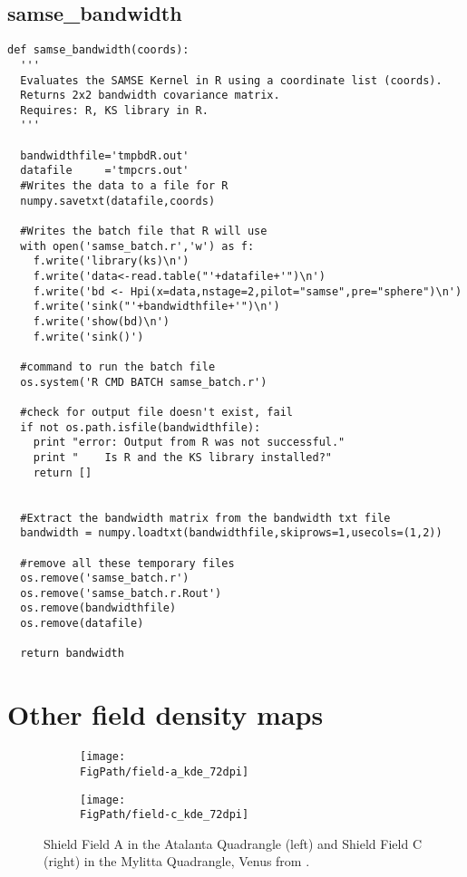 \subsection{samse\_bandwidth}
\begin{verbatim}
def samse_bandwidth(coords):
  '''
  Evaluates the SAMSE Kernel in R using a coordinate list (coords).
  Returns 2x2 bandwidth covariance matrix.
  Requires: R, KS library in R.
  '''
  
  bandwidthfile='tmpbdR.out'
  datafile     ='tmpcrs.out'
  #Writes the data to a file for R
  numpy.savetxt(datafile,coords)
  
  #Writes the batch file that R will use
  with open('samse_batch.r','w') as f:
    f.write('library(ks)\n')
    f.write('data<-read.table("'+datafile+'")\n')
    f.write('bd <- Hpi(x=data,nstage=2,pilot="samse",pre="sphere")\n')
    f.write('sink("'+bandwidthfile+'")\n')
    f.write('show(bd)\n')
    f.write('sink()')
  
  #command to run the batch file
  os.system('R CMD BATCH samse_batch.r')
  
  #check for output file doesn't exist, fail
  if not os.path.isfile(bandwidthfile):
    print "error: Output from R was not successful."
    print "    Is R and the KS library installed?"
    return []
  
  
  #Extract the bandwidth matrix from the bandwidth txt file
  bandwidth = numpy.loadtxt(bandwidthfile,skiprows=1,usecols=(1,2))
  
  #remove all these temporary files
  os.remove('samse_batch.r')
  os.remove('samse_batch.r.Rout')
  os.remove(bandwidthfile)
  os.remove(datafile)
  
  return bandwidth
\end{verbatim}


\newpage
\section{Other field density maps}

\begin{figure}[h!]
\centering
\begin{subfigure}{0.49\textwidth}
\centering
\texttt{[image: \\FigPath/field-a\_kde\_72dpi]}
\end{subfigure}
\begin{subfigure}{0.49\textwidth}
\centering
\texttt{[image: \\FigPath/field-c\_kde\_72dpi]}
\end{subfigure}
\caption[Shield Field A in the Atalanta Quadrangle and Shield Field C in the Mylitta Quadrangle, Venus from \citet{miller2012shield}]{Shield Field A in the Atalanta Quadrangle (left) and Shield Field C (right) in the Mylitta Quadrangle, Venus from \citet{miller2012shield}.}
\end{figure}

